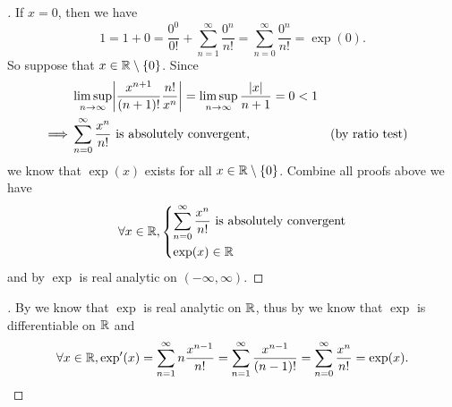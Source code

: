 \begin{proof}[]
  If \(x = 0\), then we have
  \[
    1 = 1 + 0 = \dfrac{0^0}{0!} + \sum_{n = 1}^\infty \dfrac{0^n}{n!} = \sum_{n = 0}^\infty \dfrac{0^n}{n!} = \exp(0).
  \]
  So suppose that \(x \in \mathbb{R} \setminus \left\lbrace0\right\rbrace\).
  Since
  \begin{align*}
             & \limsup_{n \to \infty} \abs{\dfrac{x^{n + 1}}{(n + 1)!} \dfrac{n!}{x^n}} = \limsup_{n \to \infty} \dfrac{\abs{x}}{n + 1} = 0 < 1                             \\
    \implies & \sum_{n = 0}^\infty \dfrac{x^n}{n!} \text{ is absolutely convergent},                                                            &  & \text{(by ratio test)}
  \end{align*}
  we know that \(\exp(x)\) exists for all \(x \in \mathbb{R} \setminus \left\lbrace0\right\rbrace\).
  Combine all proofs above we have
  \[
    \forall x \in \mathbb{R}, \begin{dcases}
      \sum_{n = 0}^\infty \dfrac{x^n}{n!} \text{ is absolutely convergent} \\
      \exp(x) \in \mathbb{R}
    \end{dcases}
  \]
  and by  \(\exp\) is real analytic on \((-\infty, \infty)\).
\end{proof}

\begin{proof}[]
  By  we know that \(\exp\) is real analytic on \(\mathbb{R}\), thus by  we know that \(\exp\) is differentiable on \(\mathbb{R}\) and
  \[
    \forall x \in \mathbb{R}, \exp'(x) = \sum_{n = 1}^\infty n \dfrac{x^{n - 1}}{n!} = \sum_{n = 1}^\infty \dfrac{x^{n - 1}}{(n - 1)!} = \sum_{n = 0}^\infty \dfrac{x^n}{n!} = \exp(x).
  \]
\end{proof}


